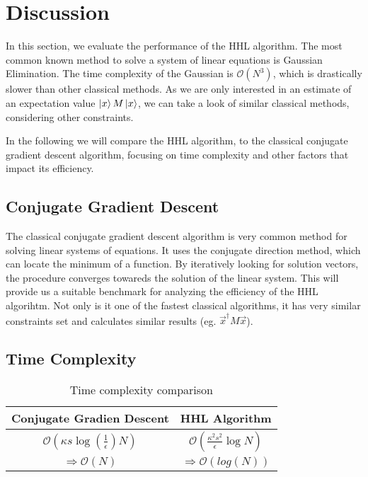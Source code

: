 \section{Discussion}

\begin{comment}
look at gauß verfahren 
not fastest
look at same constraints 
conjugate gradient descent much faster with similiar requirements
only interested in estimate of $\vec{x}^\dagger M \vec x$
this runs in $ \mathcal{O}(\kappa s log{\left(\frac 1 \epsilon\right)} N ) $
where 
\end{comment}

In this section, we evaluate the performance of the HHL algorithm.
The most common known method to solve a system of linear equations is Gaussian Elimination. 
The time complexity of the Gaussian is $\mathcal{O} (N^3)$, which is drastically slower than other classical methods.
As we are only interested in an estimate of an expectation value $\ket x M \ket x$, we can take a look of similar classical methods, considering other constraints.

In the following we will compare the HHL algorithm, to the classical conjugate gradient descent algorithm, focusing on time complexity and other factors that impact its efficiency.

\subsection{Conjugate Gradient Descent}
The classical conjugate gradient descent algorithm is very common method for solving linear systems of equations. 
It uses the conjugate direction method, which can locate the minimum of a function. 
By iteratively looking for solution vectors, the procedure converges towareds the solution of the linear system.
This will provide us a suitable benchmark for analyzing the efficiency of the HHL algorihtm.
Not only is it one of the fastest classical algorithms, it has very similar constraints set and calculates similar results (eg. $\vec{x}^\dagger M \vec x$).

\subsection{Time Complexity}
\begin{table}[htbp]
    \caption{Time complexity comparison}
    \begin{center}
    \begin{tabular}{|c|c|}
    \hline
    \textbf{Conjugate Gradien Descent} & \textbf{HHL Algorithm} \\
    \hline
    $\mathcal{O}(\kappa s \log\left(\frac{1}{\epsilon}\right) N)$  &  $\mathcal{O}\left(\frac{\kappa^2s^2}{\epsilon}\log N\right)$\\
    \hline
    $\Rightarrow \mathcal{O} (N)$ & $\Rightarrow \mathcal{O} (log(N))$\\ 
    \hline
    \end{tabular}
    \end{center}
\end{table}

